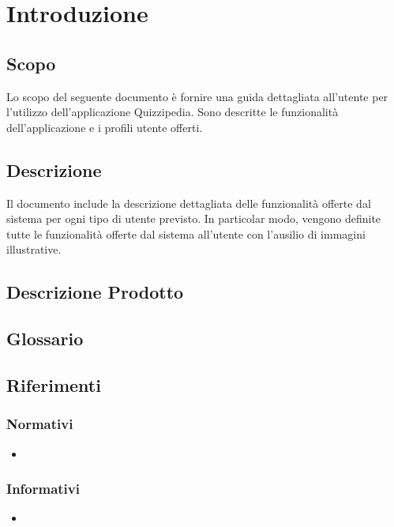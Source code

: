 \documentclass[12pt,a4paper]{article}
\begin{document}
	\newpage
	\tableofcontents
	\newpage
	\listoftables
	\listoffigures
	\newpage
	
	
	\section{Introduzione}	\label{intro}
	
	\subsection{Scopo}
	Lo scopo del seguente documento è fornire una guida dettagliata all’utente per l’utilizzo dell’applicazione Quizzipedia. Sono descritte le funzionalità dell'applicazione e i profili utente offerti.

	\subsection{Descrizione}
    Il documento include la descrizione dettagliata delle funzionalità offerte dal sistema per ogni tipo di utente previsto. In particolar modo, vengono definite tutte le funzionalità offerte dal sistema all’utente con l’ausilio di immagini illustrative. 
   
	
	\subsection{Descrizione Prodotto}
	\descrizioneProdotto
	
	\subsection{Glossario}
	\glossarioPrint
	
	\subsection{Riferimenti}
	
	\subsubsection{Normativi}
	\begin{itemize}
		\item
		
	\end{itemize}
	
	\subsubsection{Informativi}
	\begin{itemize}
		\item 
	\end{itemize}
	
\end{document}
